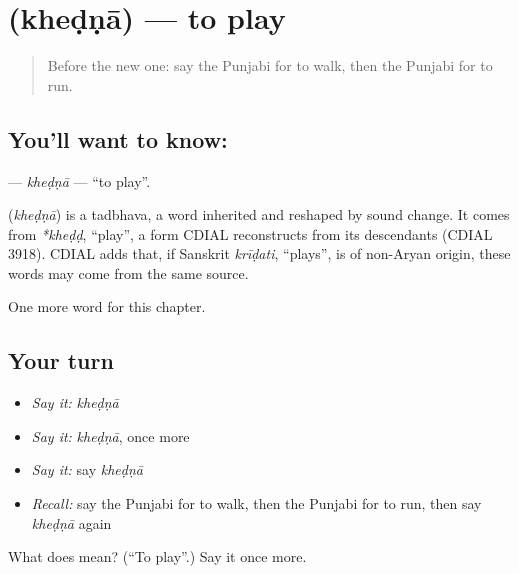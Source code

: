 \section[\texorpdfstring{\pa{ਖੇਡਣਾ} (kheḍṇā)}{ਖੇਡਣਾ (kheḍṇā)}]{ (kheḍṇā) — to play}

\label{lesson:PA-C57-khedna}



\begin{quote}
Before the new one: say the Punjabi for to walk, then the Punjabi for to run.
\end{quote}

\subsection*{You'll want to know: }
\textbf{} — \emph{kheḍṇā} — \textquotedblleft{}to play\textquotedblright{}.

\begin{cousinweb}
\textbf{} (\emph{kheḍṇā}) is a tadbhava, a word inherited and reshaped by sound change. It comes from \emph{*kheḍḍ}, \textquotedblleft{}play\textquotedblright{}, a form CDIAL reconstructs from its descendants (CDIAL 3918). CDIAL adds that, if Sanskrit \emph{krīḍati}, \textquotedblleft{}plays\textquotedblright{}, is of non-Aryan origin, these words may come from the same source.
\end{cousinweb}

\begin{grammarlens}[title={What you've built}]
One more word for this chapter.
\end{grammarlens}

\subsection*{Your turn}
\begin{itemize}
\raggedright
  \item \emph{Say it:} \emph{kheḍṇā}
  \item \emph{Say it:} \emph{kheḍṇā}, once more
  \item \emph{Say it:} say \emph{kheḍṇā}
  \item \emph{Recall:} say the Punjabi for to walk, then the Punjabi for to run, then say \emph{kheḍṇā} again
\end{itemize}

\begin{tcolorbox}[breakable,colback=teal!4,colframe=teal!35!black,title={Before you move on}]
What does  mean? (\textquotedblleft{}To play\textquotedblright{}.) Say it once more.
\end{tcolorbox}
